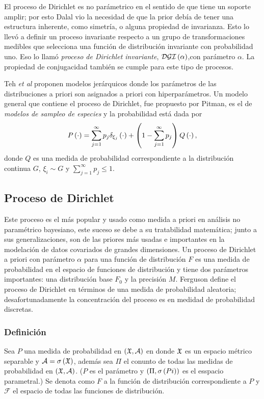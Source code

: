 \documentclass[runningheads,a4paper]{article}
\begin{document}
El proceso de Dirichlet es no parámetrico en el sentido de que tiene un soporte amplir; por esto Dalal vio la necesidad de %
que la prior debía de tener una estructura inherente, como simetría, o alguna propiedad de invarianza. Esto lo llevó a %
definir un proceso invariante respecto a un grupo de transformaciones medibles que selecciona una función de distribución %
invariante con probabilidad uno. Eso lo llamó \textit{proceso de Dirichlet invariante}, $\mathcal{DGI}\left( \alpha \right)$,con parámetro %
$\alpha$. La propiedad de conjugacidad también se cumple para este tipo de procesos.

Teh \textit{et al} proponen modelos jerárquicos donde los parámetros de las distribuciones a priori son asignados a priori %
con hiperparámetros. Un modelo general que contiene el proceso de Dirichlet, fue propuesto por Pitman, es el de \textit{modelos %
de sampleo de especies} y la probabilidad está dada por
\[
P\left( \cdot \right) = \sum_{j = 1}^{\infty} p_{j} \delta_{\xi_{j}}\left( \cdot \right) + 
            \left( 1 - \sum_{j = 1}^{\infty} p_{j} \right) Q\left( \cdot \right),
\]
donde $Q$ es una medida de probabilidad correspondiente a la distribución continua $G$, $\xi_{i} \sim G$ y $\sum_{j = 1}^%
{\infty} p_{j} \leq 1$.

\subsection{Proceso de Dirichlet}

Este proceso es el más popular y usado como medida a priori en análisis no paramétrico bayesiano, este suceso se debe a su %
tratabilidad matemática; junto a sus generalizaciones, son de las priores más usadas e importantes en la modelación de %
datos covariados de grandes dimensiones. Un proceso de Dirichlet a priori con parámetro $\alpha$ para una función de %
distribución $F$ es una medida de probabilidad en el espacio de funciones de distribución y tiene dos parámetros importantes: %
una distribución base $F_{0}$ y la precisión $M$. Ferguson define el proceso de Dirichlet en términos de una medida de %
probabilidad aleatoria; desafortunadamente la concentración del proceso es en medidad de probabilidad discretas.

\subsubsection{Definición}

Sea $P$ una medida de probabilidad en $\left( \mathfrak{X}, \mathcal{A} \right)$ en donde $\mathfrak{X}$ es un espacio métrico separable y $\mathcal{A} = \sigma\left( \mathfrak{X} \right)$, %
además sea $\Pi$ el conunto de todas las medidas de probabilidad en $\left( \mathfrak{X}, \mathcal{A} \right)$. ($P$ es el parámetro y $\Pp{\Pi, %
\sigma\Pp{Pi}}$ es el esspacio parametral.) Se denota como $F$ a la función de distribución correspondiente a $P$ y %
$\mathcal{F}$ el espacio de todas las funciones de distribución. 
\end{document}
